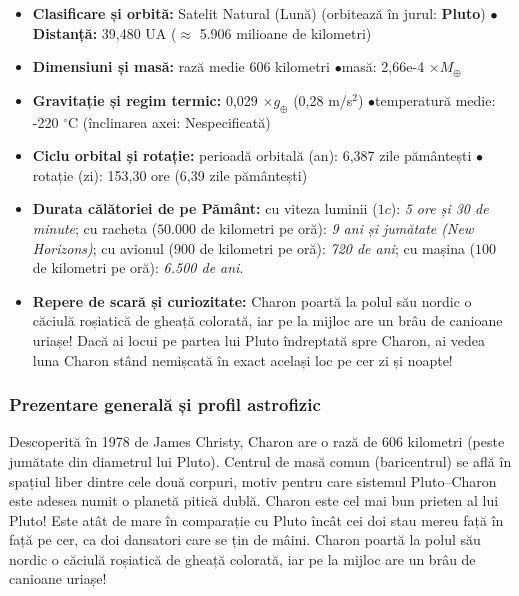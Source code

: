 \begin{tcolorbox}[orbitardata, title={\textbf{Repere esențiale: Charon}}]
\small
\begin{itemize}[leftmargin=1.4em, itemsep=2pt, topsep=2pt]
  \item \textbf{Clasificare și orbită:} Satelit Natural (Lună) (orbitează în jurul: \textbf{Pluto}) \quad$\bullet$\quad \textbf{Distanță:} 39,480 UA ($\approx$ 5.906 milioane de kilometri)
  \item \textbf{Dimensiuni și masă:} rază medie 606 kilometri \quad$\bullet$\quad masă: 2,66e-4 $\times M_\oplus$
  \item \textbf{Gravitație și regim termic:} 0,029 $\times g_\oplus$ (0,28 m/s$^2$) \quad$\bullet$\quad temperatură medie: -220 $^\circ$C (înclinarea axei: Nespecificată)
  \item \textbf{Ciclu orbital și rotație:} perioadă orbitală (an): 6,387 zile pământești \quad$\bullet$\quad rotație (zi): 153,30 ore (6,39 zile pământești)
  \item \textbf{Durata călătoriei de pe Pământ:} cu viteza luminii ($1c$): \emph{5 ore și 30 de minute}; cu racheta ($50.000$ de kilometri pe oră): \emph{9 ani și jumătate (New Horizons)}; cu avionul ($900$ de kilometri pe oră): \emph{720 de ani}; cu mașina ($100$ de kilometri pe oră): \emph{6.500 de ani}.
  \item \textbf{Repere de scară și curiozitate:} Charon poartă la polul său nordic o \guillemotleft{}căciulă\guillemotright{} roșiatică de gheață colorată, iar pe la mijloc are un brâu de canioane uriașe! Dacă ai locui pe partea lui Pluto îndreptată spre Charon, ai vedea luna Charon stând nemișcată în exact același loc pe cer zi și noapte!
\end{itemize}
\end{tcolorbox}

\subsubsection*{Prezentare generală și profil astrofizic}
Descoperită în 1978 de James Christy, Charon are o rază de 606 kilometri (peste jumătate din diametrul lui Pluto). Centrul de masă comun (baricentrul) se află în spațiul liber dintre cele două corpuri, motiv pentru care sistemul Pluto--Charon este adesea numit o planetă pitică dublă. Charon este cel mai bun prieten al lui Pluto! Este atât de mare în comparație cu Pluto încât cei doi stau mereu față în față pe cer, ca doi dansatori care se țin de mâini. Charon poartă la polul său nordic o \guillemotleft{}căciulă\guillemotright{} roșiatică de gheață colorată, iar pe la mijloc are un brâu de canioane uriașe!

